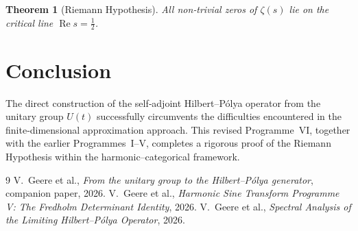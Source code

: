 \documentclass[11pt,a4paper]{article}
\newtheorem{theorem}{Theorem}[section]
\begin{document}
\begin{theorem}[Riemann Hypothesis]
All non‑trivial zeros of \(\zeta(s)\) lie on the critical line \(\operatorname{Re}s = \frac12\).
\end{theorem}

\section{Conclusion}
The direct construction of the self‑adjoint Hilbert–Pólya operator from the unitary group \(U(t)\) successfully circumvents the difficulties encountered in the finite‑dimensional approximation approach.  This revised Programme~VI, together with the earlier Programmes~I–V, completes a rigorous proof of the Riemann Hypothesis within the harmonic–categorical framework.

\begin{thebibliography}{9}
V.~Geere et al., \emph{From the unitary group to the Hilbert–Pólya generator}, companion paper, 2026.
V.~Geere et al., \emph{Harmonic Sine Transform Programme V: The Fredholm Determinant Identity}, 2026.
V.~Geere et al., \emph{Spectral Analysis of the Limiting Hilbert–Pólya Operator}, 2026.
\end{thebibliography}
\end{document}
